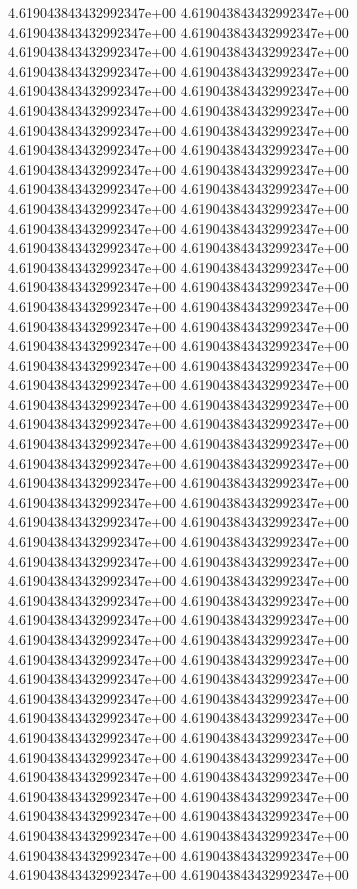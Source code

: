 4.619043843432992347e+00	4.619043843432992347e+00	4.619043843432992347e+00	4.619043843432992347e+00	4.619043843432992347e+00	4.619043843432992347e+00	4.619043843432992347e+00	4.619043843432992347e+00	4.619043843432992347e+00	4.619043843432992347e+00	4.619043843432992347e+00	4.619043843432992347e+00	4.619043843432992347e+00	4.619043843432992347e+00	4.619043843432992347e+00	4.619043843432992347e+00	4.619043843432992347e+00	4.619043843432992347e+00	4.619043843432992347e+00	4.619043843432992347e+00	4.619043843432992347e+00	4.619043843432992347e+00	4.619043843432992347e+00	4.619043843432992347e+00	4.619043843432992347e+00	4.619043843432992347e+00	4.619043843432992347e+00	4.619043843432992347e+00	4.619043843432992347e+00	4.619043843432992347e+00	4.619043843432992347e+00	4.619043843432992347e+00	4.619043843432992347e+00	4.619043843432992347e+00	4.619043843432992347e+00	4.619043843432992347e+00	4.619043843432992347e+00	4.619043843432992347e+00	4.619043843432992347e+00	4.619043843432992347e+00	4.619043843432992347e+00	4.619043843432992347e+00	4.619043843432992347e+00	4.619043843432992347e+00	4.619043843432992347e+00	4.619043843432992347e+00	4.619043843432992347e+00	4.619043843432992347e+00	4.619043843432992347e+00	4.619043843432992347e+00	4.619043843432992347e+00	4.619043843432992347e+00	4.619043843432992347e+00	4.619043843432992347e+00	4.619043843432992347e+00	4.619043843432992347e+00	4.619043843432992347e+00	4.619043843432992347e+00	4.619043843432992347e+00	4.619043843432992347e+00	4.619043843432992347e+00	4.619043843432992347e+00	4.619043843432992347e+00	4.619043843432992347e+00	4.619043843432992347e+00	4.619043843432992347e+00	4.619043843432992347e+00	4.619043843432992347e+00	4.619043843432992347e+00	4.619043843432992347e+00	4.619043843432992347e+00	4.619043843432992347e+00	4.619043843432992347e+00	4.619043843432992347e+00	4.619043843432992347e+00	4.619043843432992347e+00	4.619043843432992347e+00	4.619043843432992347e+00	4.619043843432992347e+00	4.619043843432992347e+00	4.619043843432992347e+00	4.619043843432992347e+00	4.619043843432992347e+00	4.619043843432992347e+00	4.619043843432992347e+00	4.619043843432992347e+00	4.619043843432992347e+00	4.619043843432992347e+00	4.619043843432992347e+00	4.619043843432992347e+00
